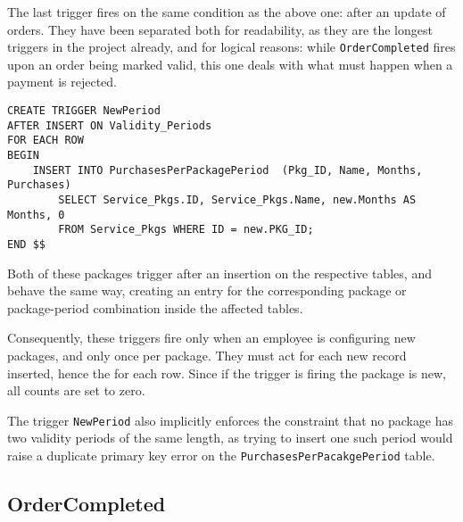 The last trigger fires on the same condition as the above one: after an update of orders. They have been separated both for readability, as they are the longest triggers in the project already, and for logical reasons: while \texttt{OrderCompleted} fires upon an order being marked valid, this one deals with what must happen when a payment is rejected.

\begin{lstlisting}[style=SQL]
CREATE TRIGGER NewPeriod
AFTER INSERT ON Validity_Periods
FOR EACH ROW
BEGIN
    INSERT INTO PurchasesPerPackagePeriod  (Pkg_ID, Name, Months, Purchases)
        SELECT Service_Pkgs.ID, Service_Pkgs.Name, new.Months AS Months, 0
        FROM Service_Pkgs WHERE ID = new.PKG_ID;
END $$
\end{lstlisting}

Both of these packages trigger after an insertion on the respective tables, and behave the same way, creating an entry for the corresponding package or package-period combination inside the affected tables.

Consequently, these triggers fire only when an employee is configuring new packages, and only once per package. They must act for each new record inserted, hence the for each row. Since if the trigger is firing the package is new, all counts are set to zero.

The trigger \texttt{NewPeriod} also implicitly enforces the constraint that no package has two validity periods of the same length, as trying to insert one such period would raise a duplicate primary key error on the \texttt{PurchasesPerPacakgePeriod} table.

\subsection{OrderCompleted}

